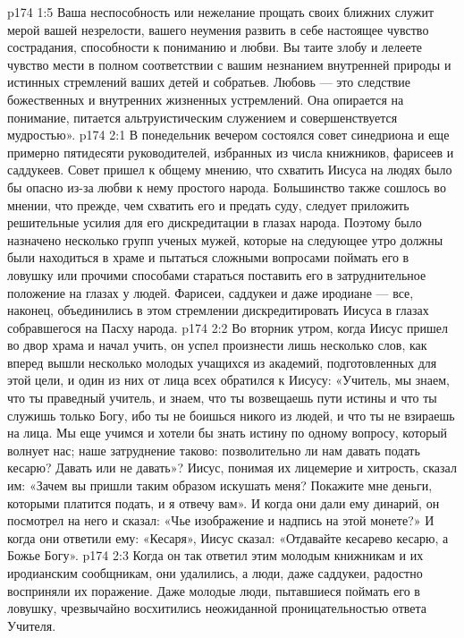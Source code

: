\vs p174 1:5 Ваша неспособность или нежелание прощать своих ближних служит мерой вашей незрелости, вашего неумения развить в себе настоящее чувство сострадания, способности к пониманию и любви. Вы таите злобу и лелеете чувство мести в полном соответствии с вашим незнанием внутренней природы и истинных стремлений ваших детей и собратьев. Любовь --- это следствие божественных и внутренних жизненных устремлений. Она опирается на понимание, питается альтруистическим служением и совершенствуется мудростью».
\vs p174 2:1 В понедельник вечером состоялся совет синедриона и еще примерно пятидесяти руководителей, избранных из числа книжников, фарисеев и саддукеев. Совет пришел к общему мнению, что схватить Иисуса на людях было бы опасно из\hyp{}за любви к нему простого народа. Большинство также сошлось во мнении, что прежде, чем схватить его и предать суду, следует приложить решительные усилия для его дискредитации в глазах народа. Поэтому было назначено несколько групп ученых мужей, которые на следующее утро должны были находиться в храме и пытаться сложными вопросами поймать его в ловушку или прочими способами стараться поставить его в затруднительное положение на глазах у людей. Фарисеи, саддукеи и даже иродиане --- все, наконец, объединились в этом стремлении дискредитировать Иисуса в глазах собравшегося на Пасху народа.
\vs p174 2:2 Во вторник утром, когда Иисус пришел во двор храма и начал учить, он успел произнести лишь несколько слов, как вперед вышли несколько молодых учащихся из академий, подготовленных для этой цели, и один из них от лица всех обратился к Иисусу: «Учитель, мы знаем, что ты праведный учитель, и знаем, что ты возвещаешь пути истины и что ты служишь только Богу, ибо ты не боишься никого из людей, и что ты не взираешь на лица. Мы еще учимся и хотели бы знать истину по одному вопросу, который волнует нас; наше затруднение таково: позволительно ли нам давать подать кесарю? Давать или не давать»? Иисус, понимая их лицемерие и хитрость, сказал им: «Зачем вы пришли таким образом искушать меня? Покажите мне деньги, которыми платится подать, и я отвечу вам». И когда они дали ему динарий, он посмотрел на него и сказал: «Чье изображение и надпись на этой монете?» И когда они ответили ему: «Кесаря», Иисус сказал: «Отдавайте кесарево кесарю, а Божье Богу».
\vs p174 2:3 Когда он так ответил этим молодым книжникам и их иродианским сообщникам, они удалились, а люди, даже саддукеи, радостно восприняли их поражение. Даже молодые люди, пытавшиеся поймать его в ловушку, чрезвычайно восхитились неожиданной проницательностью ответа Учителя.
